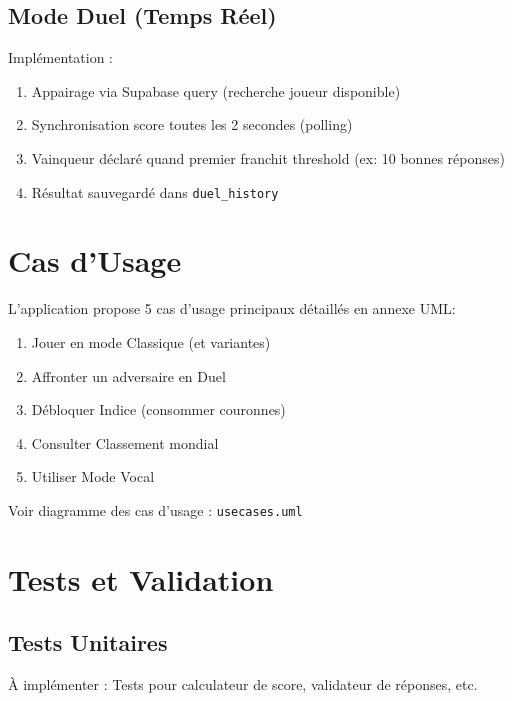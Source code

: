 \documentclass[12pt,a4paper,openany]{report}
\begin{document}
    \section{Mode Duel (Temps Réel)}

    Implémentation :
    \begin{enumerate}
      \item Appairage via Supabase query (recherche joueur disponible)
      \item Synchronisation score toutes les 2 secondes (polling)
      \item Vainqueur déclaré quand premier franchit threshold (ex: 10 bonnes réponses)
      \item Résultat sauvegardé dans \texttt{duel\_history}
    \end{enumerate}

    \chapter{Cas d'Usage}

    L'application propose 5 cas d'usage principaux détaillés en annexe UML:

    \begin{enumerate}
      \item Jouer en mode Classique (et variantes)
      \item Affronter un adversaire en Duel
      \item Débloquer Indice (consommer couronnes)
      \item Consulter Classement mondial
      \item Utiliser Mode Vocal
    \end{enumerate}

    \noindent Voir diagramme des cas d'usage : \texttt{usecases.uml}

    \chapter{Tests et Validation}

    \section{Tests Unitaires}

    À implémenter : Tests pour calculateur de score, validateur de réponses, etc.
\end{document}
